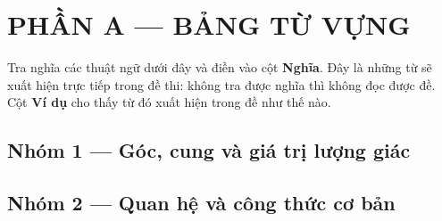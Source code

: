 \documentclass[11pt, a4paper]{article}
\begin{document}

\section{PHẦN A — BẢNG TỪ VỰNG}

Tra nghĩa các thuật ngữ dưới đây và điền vào cột \textbf{Nghĩa}. Đây là những từ sẽ xuất hiện trực tiếp trong đề thi: không tra được nghĩa thì không đọc được đề. Cột \textbf{Ví dụ} cho thấy từ đó xuất hiện trong đề như thế nào.

\subsection{Nhóm 1 — Góc, cung và giá trị lượng giác}


\subsection{Nhóm 2 — Quan hệ và công thức cơ bản}
\end{document}
